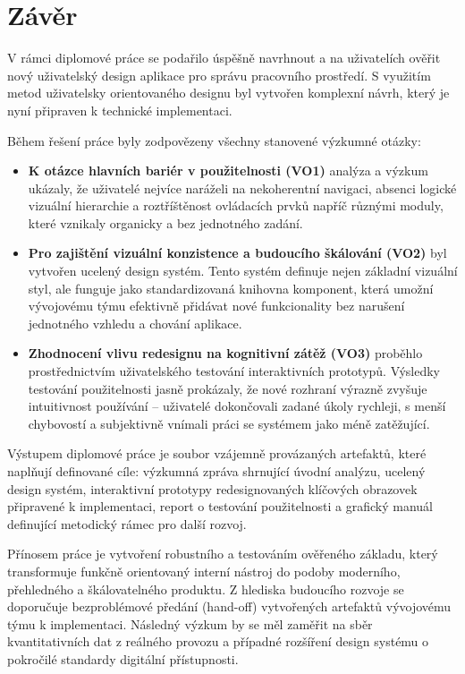 \chapter*{Závěr}


V rámci diplomové práce se podařilo úspěšně navrhnout a na uživatelích ověřit nový uživatelský design aplikace pro správu pracovního prostředí. S využitím metod uživatelsky orientovaného designu byl vytvořen komplexní návrh, který je nyní připraven k technické implementaci.

Během řešení práce byly zodpovězeny všechny stanovené výzkumné otázky:

\begin{itemize}
    \item \textbf{K otázce hlavních bariér v použitelnosti (VO1)} analýza a výzkum ukázaly, že uživatelé nejvíce naráželi na nekoherentní navigaci, absenci logické vizuální hierarchie a roztříštěnost ovládacích prvků napříč různými moduly, které vznikaly organicky a bez jednotného zadání.
    \item \textbf{Pro zajištění vizuální konzistence a budoucího škálování (VO2)} byl vytvořen ucelený design systém. Tento systém definuje nejen základní vizuální styl, ale funguje jako standardizovaná knihovna komponent, která umožní vývojovému týmu efektivně přidávat nové funkcionality bez narušení jednotného vzhledu a chování aplikace.
    \item \textbf{Zhodnocení vlivu redesignu na kognitivní zátěž (VO3)} proběhlo prostřednictvím uživatelského testování interaktivních prototypů. Výsledky testování použitelnosti jasně prokázaly, že nové rozhraní výrazně zvyšuje intuitivnost používání – uživatelé dokončovali zadané úkoly rychleji, s menší chybovostí a subjektivně vnímali práci se systémem jako méně zatěžující.
\end{itemize}

Výstupem diplomové práce je soubor vzájemně provázaných artefaktů, které naplňují definované cíle: výzkumná zpráva shrnující úvodní analýzu, ucelený design systém, interaktivní prototypy redesignovaných klíčových obrazovek připravené k implementaci, report o testování použitelnosti a grafický manuál definující metodický rámec pro další rozvoj.

Přínosem práce je vytvoření robustního a testováním ověřeného základu, který transformuje funkčně orientovaný interní nástroj do podoby moderního, přehledného a škálovatelného produktu. Z hlediska budoucího rozvoje se doporučuje bezproblémové předání (hand-off) vytvořených artefaktů vývojovému týmu k implementaci. Následný výzkum by se měl zaměřit na sběr kvantitativních dat z reálného provozu a případné rozšíření design systému o pokročilé standardy digitální přístupnosti.
